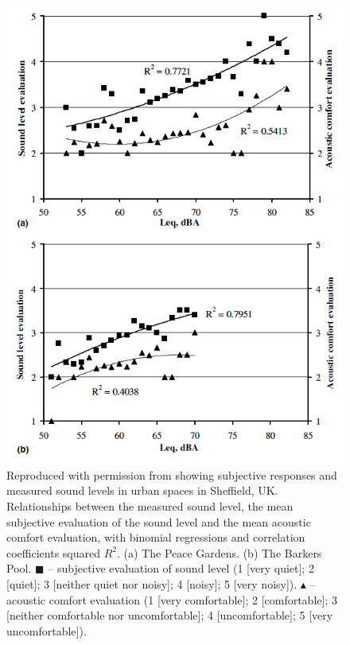 \begin{figure}
  \centering
  \includegraphics[width=.8\textwidth]{Figures/YangKang2005 Acoustic Comfort dB.png}
  \caption{Reproduced with permission from \citep[Fig. 2]{Yang2005Acoustic} showing subjective responses and measured sound levels in urban spaces in Sheffield, UK. Relationships between the measured sound level, the mean subjective evaluation of the sound level and the mean acoustic comfort evaluation, with binomial regressions and correlation coefficients squared $R^2$. (a) The Peace Gardens. (b) The Barkers Pool. $\blacksquare$ -- subjective evaluation of sound level (1 [very quiet]; 2 [quiet]; 3 [neither quiet nor noisy]; 4 [noisy]; 5 [very noisy]). $\blacktriangle$ -- acoustic comfort evaluation (1 [very comfortable]; 2 [comfortable]; 3 [neither comfortable nor uncomfortable]; 4 [uncomfortable]; 5 [very uncomfortable]). \label{fig:yang2005acousticComfort} }
\end{figure}



